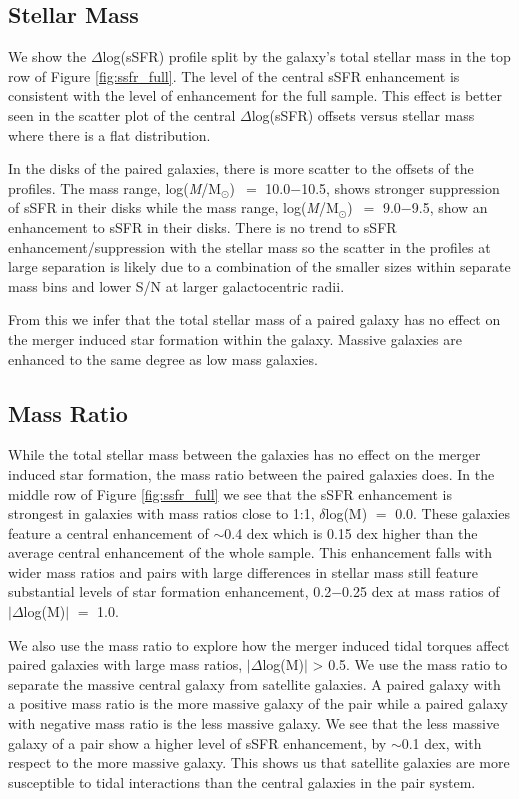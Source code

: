 \documentclass[iop,revtex4,twocolumn,apj,numberedappendix,appendixfloats]{emulateapj}
\newcommand{\logm}{log({\it M}/M$_{\odot}$)}
\begin{document}
\subsection{Stellar Mass}
We show the $\Delta$log(sSFR) profile split by the galaxy's total stellar mass in the top row of Figure \ref{fig:ssfr_full}. The level of the central sSFR enhancement is consistent with the level of enhancement for the full sample. This effect is better seen in the scatter plot of the central $\Delta$log(sSFR) offsets versus stellar mass where there is a flat distribution. 

In the disks of the paired galaxies, there is more scatter to the offsets of the profiles. The mass range, \logm\ $=$ 10.0$-$10.5, shows stronger suppression of sSFR in their disks while the mass range, \logm\ $=$ 9.0$-$9.5, show an enhancement to sSFR in their disks. There is no trend to sSFR enhancement/suppression with the stellar mass so the scatter in the profiles at large separation is likely due to a combination of the smaller sizes within separate mass bins and lower S/N at larger galactocentric radii.

From this we infer that the total stellar mass of a paired galaxy has no effect on the merger induced star formation within the galaxy. Massive galaxies are enhanced to the same degree as low mass galaxies. 

\subsection{Mass Ratio}
While the total stellar mass between the galaxies has no effect on the merger induced star formation, the mass ratio between the paired galaxies does. In the middle row of Figure \ref{fig:ssfr_full} we see that the sSFR enhancement is strongest in galaxies with mass ratios close to 1:1, $\delta$log(M) $=$ 0.0. These galaxies feature a central enhancement of $\sim$0.4 dex which is 0.15 dex higher than the average central enhancement of the whole sample. This enhancement falls with wider mass ratios and pairs with large differences in stellar mass still feature substantial levels of star formation enhancement, 0.2$-$0.25 dex at mass ratios of $|\Delta$log(M)$|$ $=$ 1.0.

We also use the mass ratio to explore how the merger induced tidal torques affect paired galaxies with large mass ratios, $|\Delta$log(M)$|$ > 0.5. We use the mass ratio to separate the massive central galaxy from satellite galaxies. A paired galaxy with a positive mass ratio is the more massive galaxy of the pair while a paired galaxy with negative mass ratio is the less massive galaxy. We see that the less massive galaxy of a pair show a higher level of sSFR enhancement, by $\sim$0.1 dex, with respect to the more massive galaxy. This shows us that satellite galaxies are more susceptible to tidal interactions than the central galaxies in the pair system. 
\end{document}
